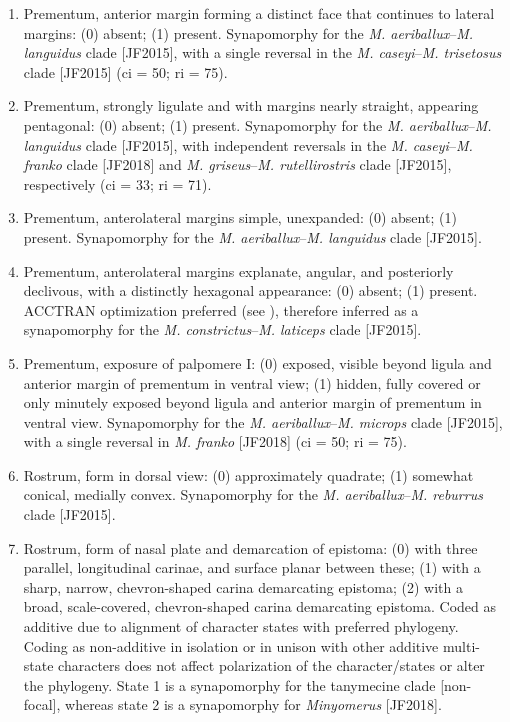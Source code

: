 \documentclass[fleqn,10pt,lineno]{wlpeerj} %
\begin{document}
\begin{enumerate}
	 	\item Prementum, anterior margin forming a distinct face that continues to lateral margins: (0) absent; (1) present. Synapomorphy for the \textit{M. aeriballux}--\textit{M. languidus} clade [JF2015], with a single reversal in the  \textit{M. caseyi}--\textit{M. trisetosus} clade [JF2015] (ci = 50; ri = 75).
	 	
	 	\item Prementum, strongly ligulate and with margins nearly straight, appearing pentagonal: (0) absent; (1) present. Synapomorphy for the \textit{M. aeriballux}--\textit{M. languidus} clade [JF2015], with independent reversals in the \textit{M. caseyi}--\textit{M. franko} clade [JF2018] and \textit{M. griseus}--\textit{M. rutellirostris} clade [JF2015], respectively (ci = 33; ri = 71).
	 	
	 	\item Prementum, anterolateral margins simple, unexpanded: (0) absent; (1) present. Synapomorphy for the \textit{M. aeriballux}--\textit{M. languidus} clade [JF2015].
	 	
	 	\item Prementum, anterolateral margins explanate, angular, and posteriorly declivous, with a distinctly hexagonal appearance: (0) absent; (1) present. ACCTRAN optimization preferred (see \citealt{agnarsson2008}), therefore inferred as a synapomorphy for the \textit{M. constrictus}--\textit{M. laticeps} clade [JF2015].
	 	
	 	\item Prementum, exposure of palpomere I: (0) exposed, visible beyond ligula and anterior margin of prementum in ventral view; (1) hidden, fully covered or only minutely exposed beyond ligula and anterior margin of prementum in ventral view. Synapomorphy for the \textit{M. aeriballux}--\textit{M. microps} clade [JF2015], with a single reversal in \textit{M. franko} [JF2018] (ci = 50; ri = 75).
	 	
	 	\item Rostrum, form in dorsal view: (0) approximately quadrate; (1) somewhat conical, medially convex. Synapomorphy for the \textit{M. aeriballux}--\textit{M. reburrus} clade [JF2015].
	 	
	 	\item Rostrum, form of nasal plate and demarcation of epistoma: (0) with three parallel, longitudinal carinae, and surface planar between these; (1) with a sharp, narrow, chevron-shaped carina demarcating epistoma; (2) with a broad, scale-covered, chevron-shaped carina demarcating epistoma. Coded as additive due to alignment of character states with preferred phylogeny. Coding as non-additive in isolation or in unison with other additive multi-state characters does not affect polarization of the character/states or alter the phylogeny. State 1 is a synapomorphy for the tanymecine clade [non-focal], whereas state 2 is a synapomorphy for \textit{Minyomerus} [JF2018].
	 	

\end{enumerate}
\end{document}
